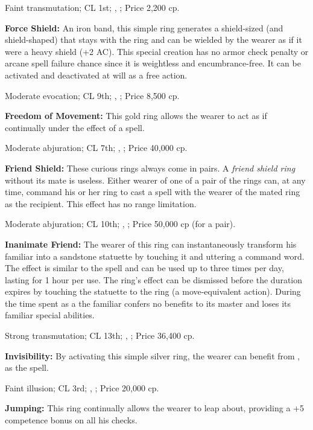 Faint transmutation; CL 1st; , ; Price 2,200 cp.


\textbf{Force Shield:} An iron band, this simple ring generates a shield-sized (and shield-shaped)  that stays with the ring and can be wielded by the wearer as if it were a heavy shield (+2 AC). This special creation has no armor check penalty or arcane spell failure chance since it is weightless and encumbrance-free. It can be activated and deactivated at will as a free action.

Moderate evocation; CL 9th; , ; Price 8,500 cp.


\textbf{Freedom of Movement:} This gold ring allows the wearer to act as if continually under the effect of a  spell.

Moderate abjuration; CL 7th; , ; Price 40,000 cp.


\textbf{Friend Shield:} These curious rings always come in pairs. A \emph{friend shield ring} without its mate is useless. Either wearer of one of a pair of the rings can, at any time, command his or her ring to cast a  spell with the wearer of the mated ring as the recipient. This effect has no range limitation.

Moderate abjuration; CL 10th; , ; Price 50,000 cp (for a pair).


\textbf{Inanimate Friend:} The wearer of this ring can instantaneously transform his familiar into a sandstone statuette by touching it and uttering a command word. The effect is similar to the  spell and can be used up to three times per day, lasting for 1 hour per use. The ring's effect can be dismissed before the duration expires by touching the statuette to the ring (a move-equivalent action). During the time spent as a  the familiar confers no benefits to its master and loses its familiar special abilities.

Strong transmutation; CL 13th; , ; Price 36,400 cp.


\textbf{Invisibility:} By activating this simple silver ring, the wearer can benefit from , as the spell.

Faint illusion; CL 3rd; , ; Price 20,000 cp.


\textbf{Jumping:} This ring continually allows the wearer to leap about, providing a +5 competence bonus on all his  checks.

